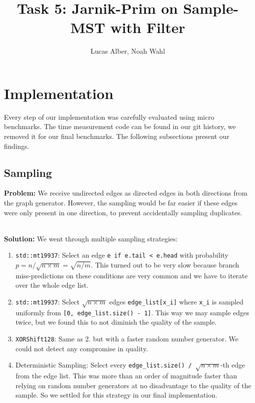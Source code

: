 \documentclass{article}
\begin{document}
\title{Task 5: Jarnik-Prim on Sample-MST with Filter}
\author{Lucas Alber, Noah Wahl}
\maketitle

\section{Implementation}

Every step of our implementation was carefully evaluated using micro benchmarks.
The time measurement code can be found in our git history, we removed it for our final benchmarks.
The following subsections present our findings.

\subsection{Sampling}
\textbf{Problem:} We receive undirected edges as directed edges in both directions from the graph generator.
However, the sampling would be far easier if these edges were only present in one direction, to prevent accidentally sampling duplicates.

\noindent \\
\textbf{Solution:} We went through multiple sampling strategies:

\begin{enumerate}
\item \texttt{std::mt19937}: Select an edge \texttt{e if e.tail < e.head} with probability $p = n / \sqrt{n \times m} = \sqrt{n / m}$.
This turned out to be very slow because branch miss-predictions on these conditions are very common and we have to iterate over the whole edge list.

\item \texttt{std::mt19937}: Select $\sqrt{n \times m}$ edges \texttt{edge\_list[x\_i]} where \texttt{x\_i} is sampled uniformly from \texttt{[0, edge\_list.size() - 1]}.
This way we may sample edges twice, but we found this to not diminish the quality of the sample.

\item \texttt{XORShift128}: Same as 2. but with a faster random number generator.
We could not detect any compromise in quality.

\item Deterministic Sampling: Select every \texttt{edge\_list.size() / $\sqrt{n \times m}$}-th edge from the edge list.
This was more than an order of magnitude faster than relying on random number generators at no disadvantage to the quality of the sample.
So we settled for this strategy in our final implementation.
\end{enumerate}
\end{document}
